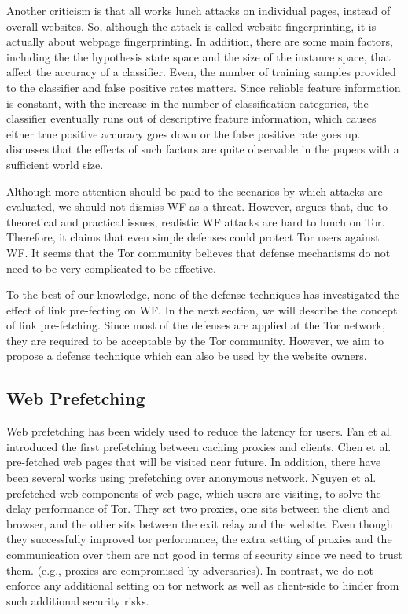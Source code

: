 Another criticism is that all works lunch attacks on individual pages, instead of overall websites. So, although the attack is called website fingerprinting, it is actually about webpage fingerprinting. In addition, there are some main factors, including the the hypothesis state space and the size of the instance space, that affect the accuracy of a classifier. Even, the number of training samples provided to the classifier and false positive rates matters. Since reliable feature information is constant, with the increase in the number of classification categories, the classifier eventually runs out of descriptive feature information, which causes either true positive accuracy goes down or the false positive rate goes up. \cite{TorBlog} discusses that the effects of such factors are quite observable in the papers with a sufficient world size.

Although more attention should be paid to the scenarios by which attacks are evaluated, we should not dismiss WF as a threat. However, \cite{TorBlog} argues that, due to theoretical and practical issues, realistic WF attacks are hard to lunch on Tor. Therefore, it claims that even simple defenses could protect Tor users against WF. It seems that the Tor community believes that defense mechanisms do not need to be very complicated to be effective.

To the best of our knowledge, none of the defense techniques has investigated the effect of link pre-fecting on WF. In the next section, we will describe the concept of link pre-fetching. Since most of the defenses are applied at the Tor network, they are required to be acceptable by the Tor community. However, we aim to propose a defense technique which can also be used by the website owners. 
\subsection{Web Prefetching}
Web prefetching has been widely used to reduce the latency for users. Fan et al.\cite{Fan1999} introduced the first prefetching between caching proxies and clients. Chen et al. \cite{Chen2003} pre-fetched web pages that will be visited near future. In addition, there have been several works using prefetching over anonymous network. Nguyen et al. \cite{} prefetched web components of web page, which users are visiting, to solve the delay performance of Tor. They set two proxies, one sits between the client and browser, and the other sits between the exit relay and the website. Even though they successfully improved tor performance, the extra setting of proxies and the communication over them are not good in terms of security since we need to trust them. (e.g., proxies are compromised by adversaries). In contrast, we do not enforce any additional setting on tor network as well as client-side to hinder from such additional security risks.  


